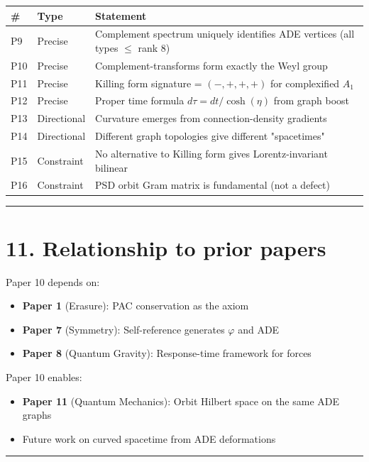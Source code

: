\documentclass[11pt,a4paper]{article}
\providecommand{\tightlist}{\setlength{\itemsep}{0pt}\setlength{\parskip}{0pt}}
\begin{document}
\begin{longtable}[]{@{}lll@{}}
\toprule
\# & Type & Statement \\
\midrule\endhead
P9 & Precise & Complement spectrum uniquely identifies ADE vertices (all types $\leq$ rank 8) \\
P10 & Precise & Complement-transforms form exactly the Weyl group \\
P11 & Precise & Killing form signature = $(-,+,+,+)$ for complexified $A_1$ \\
P12 & Precise & Proper time formula $d\tau = dt/\cosh(\eta)$ from graph boost \\
P13 & Directional & Curvature emerges from connection-density gradients \\
P14 & Directional & Different graph topologies give different "spacetimes" \\
P15 & Constraint & No alternative to Killing form gives Lorentz-invariant bilinear \\
P16 & Constraint & PSD orbit Gram matrix is fundamental (not a defect) \\
\bottomrule
\end{longtable}

\begin{center}\rule{0.5\linewidth}{0.4pt}\end{center}

\section*{11. Relationship to prior papers}

Paper 10 depends on:
\begin{itemize}\tightlist
\item \textbf{Paper 1} (Erasure): PAC conservation as the axiom
\item \textbf{Paper 7} (Symmetry): Self-reference generates $\varphi$ and ADE
\item \textbf{Paper 8} (Quantum Gravity): Response-time framework for forces
\end{itemize}

Paper 10 enables:
\begin{itemize}\tightlist
\item \textbf{Paper 11} (Quantum Mechanics): Orbit Hilbert space on the same ADE graphs
\item Future work on curved spacetime from ADE deformations
\end{itemize}

\begin{center}\rule{0.5\linewidth}{0.4pt}\end{center}
\end{document}
